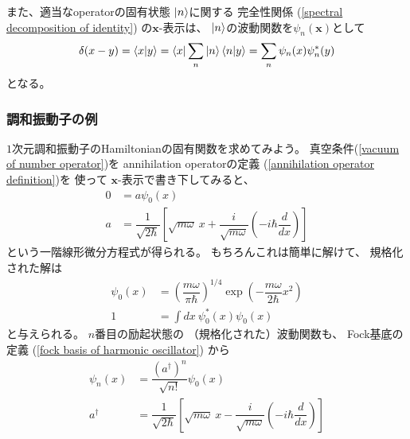 また、適当なoperatorの固有状態
$\ket{n}$に関する
完全性関係
(\ref{spectral decomposition of identity})
の$\bm{x}$-表示は、
$\ket{n}$の波動関数を$\psi_n( \bm{x} )$として
\begin{align}
    \delta(x - y)
    =
    \braket{ x | y }
    =
    \bra{ x }
        \sum_n
        \ket{n}
        \braket{ n | y }
    =
    \sum_n
    \psi_n( x )
    \psi_n^*( y )
\label{complete set of wave function}
\end{align}
となる。

\subsubsection{調和振動子の例}

$1$次元調和振動子のHamiltonianの固有関数を求めてみよう。
真空条件(\ref{vacuum of number operator})を
annihilation operatorの定義
(\ref{annihilation operator definition})を
使って
$\bm{x}$-表示で書き下してみると、
\begin{subequations}
\begin{align}
    0
    &=
    a \psi_0(x)
\\
    a
    &=
    \dfrac{1}{\sqrt{2\hbar}}
    \left[
        \sqrt{
            m\omega
        }\ x
        +
        \dfrac{i}{\sqrt{m\omega}}
        \left(
            - i \hbar \dfrac{d}{dx}
        \right)
    \right]
\end{align}
\end{subequations}
という一階線形微分方程式が得られる。
もちろんこれは簡単に解けて、
規格化された解は
\begin{subequations}
\begin{align}
    \psi_0 (x)
    &=
    \left(
        \dfrac{m \omega}{\pi \hbar}        
    \right)^{1/4}
    \exp(- \dfrac{m \omega}{2 \hbar} x^2)
\label{vacuum solution of harmonic oscillator}
\\
    1
    &=
    \int dx\ 
        \psi_0 ^* (x)
        \psi_0    (x)
\end{align}
\end{subequations}
と与えられる。
$n$番目の励起状態の
（規格化された）波動関数も、
Fock基底の定義
(\ref{fock basis of harmonic oscillator})
から
\begin{subequations}
\begin{align}
    \psi_n (x)
    &=
    \dfrac{ (a^\dagger)^n }{ \sqrt{n!} }
    \psi_0 (x)
\\
    a^\dagger
    &=
    \dfrac{1}{\sqrt{2\hbar}}
    \left[
        \sqrt{
            m\omega
        }\ x
        -
        \dfrac{i}{\sqrt{m\omega}}
        \left(
            - i \hbar \dfrac{d}{dx}
        \right)
    \right]
\end{align}
\end{subequations}
